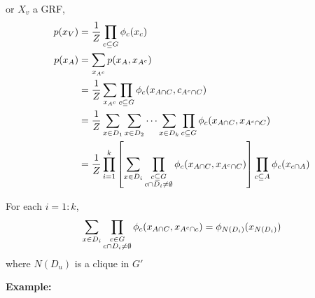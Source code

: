 \documentclass[12pt]{report}
\newcommand{\sub}{\subseteq}
\newcommand*{\tbf}[1]{\ifmmode\mathbf{#1}\else\textbf{#1}\fi}
\newenvironment*{tbox}[2][gray]{
    \begin{tcolorbox}[
        parbox=false,
        colback=#1!5!white,
        colframe=#1!75!black,
        breakable,
        title={#2}
    ]}
    {\end{tcolorbox}}
\begin{document}
\begin{tbox}
    For $X_v$ a GRF,
    \begin{align*}
        p(x_V) & = \frac{1}{Z} \prod_{c \sub G} \phi_c(x_c)                                                                                                                \\
        p(x_A) & = \sum_{x_{A^c}} p(x_A, x_{A^c})                                                                                                                          \\
               & = \frac{1}{Z} \sum_{x_{A^c}} \prod_{c \sub G} \phi_c(x_{A\cap C}, c_{A^c \cap C})                                                                         \\
               & = \frac{1}{Z} \sum_{x \in D_1} \sum_{x \in D_2}\dots \sum_{x \in D_k} \prod_{c \sub G} \phi_c(x_{A\cap C}, x_{A^c \cap C})                                \\
               & = \frac{1}{Z}\prod_{i=1}^k\left[\sum_{x \in D_i} \prod_{\begin{subarray}{c}
                                                                                     c \sub G \\
                                                                                     c \cap D_i \neq \emptyset
                                                                                 \end{subarray}} \phi_c(x_{A \cap C}, x_{A^c \cap C})\right] \prod_{c \sub A} \phi_c(x_{c \cap A})
    \end{align*}

    For each $i = 1: k$,
    \[\sum_{x \in D_i} \prod_{\begin{subarray}{c}
                c\in G\\
                c \cap D_i \neq \emptyset
            \end{subarray}} \phi_c(x_{A\cap C}, x_{A^c \cap c}) = \phi_{N(D_i)}(x_{N(D_i)})\]
    where $N(D_u)$ is a clique in $G'$
\end{tbox}

\tbf{Example:}

\begin{center}
\end{center}
\end{document}
